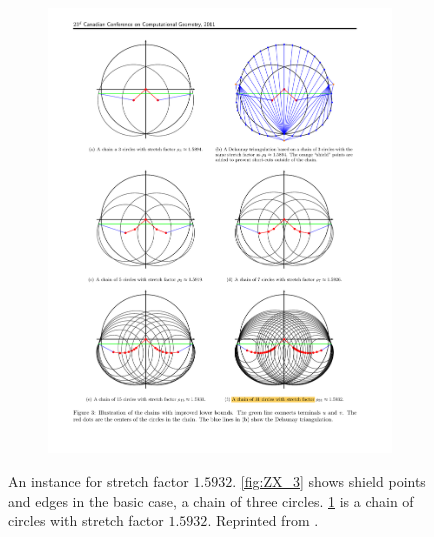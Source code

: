 \begin{figure}[ht]
\begin{subfigure}{0.45\textwidth}
\includegraphics[width=\linewidth]{Figures/ZX_31.pdf}
\caption{} \label{fig:ZX_31}
\end{subfigure}
\hspace*{\fill}
\caption[A chain of circles with the stretch factor $1.5932$]{An instance for stretch factor $1.5932$. \ref{fig:ZX_3} shows shield points and edges in the basic case, a chain of three circles. \ref{fig:ZX_31} is a chain of circles with stretch factor $1.5932$. Reprinted from \cite{fwcg2010}.} \label{fig:ZX}
\end{figure}








